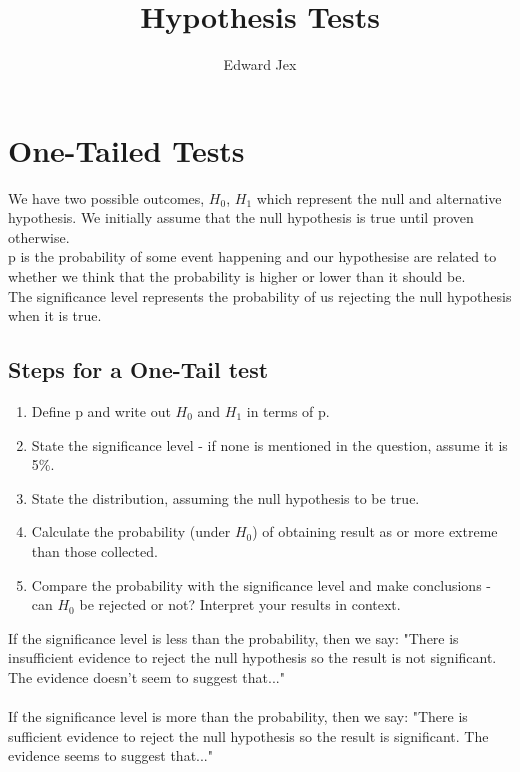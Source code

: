 \documentclass[a4paper,12pt]{article}
\begin{document}
\title{Hypothesis Tests}	
\author{Edward Jex}
\maketitle
\section*{One-Tailed Tests}
We have two possible outcomes, $H_0$, $H_1$ which represent the null and alternative hypothesis. We initially assume that the null hypothesis is true until proven otherwise. \\
p is the probability of some event happening and our hypothesise are related to whether we think that the probability is higher or lower than it should be. \\
The significance level represents the probability of us rejecting the null hypothesis when it is true. \\

\subsection*{Steps for a One-Tail test}
\begin{enumerate}
	\item Define p and write out $H_0$ and $H_1$ in terms of p.
	\item State the significance level - if none is mentioned in the question, assume it is 5\%.
	\item State the distribution, assuming the null hypothesis to be true.
	\item Calculate the probability (under $H_0$) of obtaining result as or more extreme than those collected. 
	\item Compare the probability with the significance level and make conclusions - can $H_0$ be rejected or not? Interpret your results in context. 
\end{enumerate}

If the significance level is less than the probability, then we say: "There is insufficient evidence to reject the null hypothesis so the result is not significant. The evidence doesn't seem to suggest that..." \\\\
	If the significance level is more than the probability, then we say: "There is sufficient evidence to reject the null hypothesis so the result is significant. The evidence seems to suggest that..." 
\end{document}
